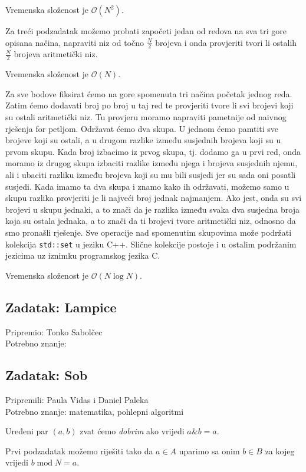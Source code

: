 \documentclass[a4paper]{article}
\begin{document}
Vremenska složenost je $\mathcal{O}(N^2)$.

Za treći podzadatak možemo probati započeti jedan od redova na sva tri gore
opisana načina, napraviti niz od točno $\frac{N}{2}$ brojeva i onda provjeriti
tvori li ostalih $\frac{N}{2}$ brojeva aritmetički niz.

Vremenska složenost je $\mathcal{O}(N)$.

Za sve bodove fiksirat ćemo na gore spomenuta tri načina početak jednog reda.
Zatim ćemo dodavati broj po broj u taj red te provjeriti tvore li svi brojevi
koji su ostali aritmetički niz. Tu provjeru moramo napraviti pametnije od
naivnog rješenja for petljom. Održavat ćemo dva skupa. U jednom ćemo pamtiti sve
brojeve koji su ostali, a u drugom razlike između susjednih brojeva koji su u
prvom skupu. Kada broj izbacimo iz prvog skupa, tj. dodamo ga u prvi red, onda
moramo iz drugog skupa izbaciti razlike između njega i brojeva susjednih njemu,
ali i ubaciti razliku između brojeva koji su mu bili susjedi jer su sada oni
posatli susjedi. Kada imamo ta dva skupa i znamo kako ih održavati, možemo samo
u skupu razlika provjeriti je li najveći broj jednak najmanjem. Ako jest, onda
su svi brojevi u skupu jednaki, a to znači da je razlika između svaka dva
susjedna broja koja su ostala jednaka, a to znači da ti brojevi tvore
aritmetički niz, odnosno da smo pronašli rješenje. Sve operacije nad
spomenutim skupovima može podržati kolekcija \texttt{std::set} u jeziku
C++. Slične kolekcije postoje i u ostalim podržanim jezicima uz iznimku
programskog jezika C.

Vremenska složenost je $\mathcal{O}(N \log N)$.

\subsection*{Zadatak: Lampice}
\textsf{Pripremio: Tonko Sabolčec}\\
\textsf{Potrebno znanje: }

\subsection*{Zadatak: Sob}
\textsf{Pripremili: Paula Vidas i Daniel Paleka}\\
\textsf{Potrebno znanje: matematika, pohlepni algoritmi}

Uređeni par $(a, b)$ zvat ćemo \emph{dobrim} ako vrijedi $a \mathbin\& b = a$.

Prvi podzadatak možemo riješiti tako da $a \in A$ uparimo sa onim $b \in B$ za
kojeg vrijedi $b \mathbin{\textrm{mod}} N = a$.
\end{document}
